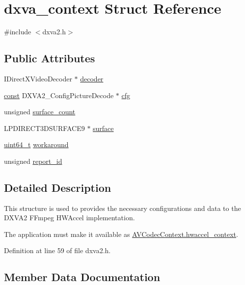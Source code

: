 \hypertarget{structdxva__context}{}\section{dxva\+\_\+context Struct Reference}
\label{structdxva__context}


{\ttfamily \#include $<$dxva2.\+h$>$}

\subsection*{Public Attributes}
\begin{DoxyCompactItemize}
\item 
I\+Direct\+X\+Video\+Decoder $\ast$ \hyperlink{structdxva__context_a1029d27444d680f4a35ff5645231121a}{decoder}
\item 
\hyperlink{getopt1_8c_a2c212835823e3c54a8ab6d95c652660e}{const} D\+X\+V\+A2\+\_\+\+Config\+Picture\+Decode $\ast$ \hyperlink{structdxva__context_aa384da68277dd76f744c4ed23d27c4be}{cfg}
\item 
unsigned \hyperlink{structdxva__context_a850b67a58a1925ea525461f7e2899384}{surface\+\_\+count}
\item 
L\+P\+D\+I\+R\+E\+C\+T3\+D\+S\+U\+R\+F\+A\+C\+E9 $\ast$ \hyperlink{structdxva__context_a68afa12df83019834d8ff22a08788054}{surface}
\item 
\hyperlink{lib-src_2ffmpeg_2win32_2stdint_8h_aec6fcb673ff035718c238c8c9d544c47}{uint64\+\_\+t} \hyperlink{structdxva__context_a5d10a13f859a2a39ef586786e2f836ea}{workaround}
\item 
unsigned \hyperlink{structdxva__context_ab523653754a6a6eba2fa2782fa6ca8f2}{report\+\_\+id}
\end{DoxyCompactItemize}


\subsection{Detailed Description}
This structure is used to provides the necessary configurations and data to the D\+X\+V\+A2 F\+Fmpeg H\+W\+Accel implementation.

The application must make it available as \hyperlink{struct_a_v_codec_context_ab222f7d747dfdceff0a76999e09648c0}{A\+V\+Codec\+Context.\+hwaccel\+\_\+context}. 

Definition at line 59 of file dxva2.\+h.



\subsection{Member Data Documentation}

